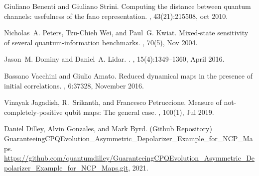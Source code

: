\documentclass[12pt]{iopart}
\begin{document}
\begin{thebibliography}{10}
Giuliano Benenti and Giuliano Strini.
\newblock Computing the distance between quantum channels: usefulness of the
  fano representation.
,
  43(21):215508, oct 2010.

Nicholas~A. Peters, Tzu-Chieh Wei, and Paul~G. Kwiat.
\newblock Mixed-state sensitivity of several quantum-information benchmarks.
, 70(5), Nov 2004.

Jason~M. {Dominy} and Daniel~A. {Lidar}.
.
, 15(4):1349--1360, April 2016.

Bassano Vacchini and Giulio Amato.
\newblock Reduced dynamical maps in the presence of initial correlations.
, 6:37328, November 2016.

Vinayak Jagadish, R.~Srikanth, and Francesco Petruccione.
\newblock Measure of not-completely-positive qubit maps: The general case.
, 100(1), Jul 2019.

Daniel Dilley, Alvin Gonzales, and Mark Byrd.
\newblock ({G}ithub {R}epository)
  {GuaranteeingCPQEvolution}\_{A}symmetric\_{D}epolarizer\_{E}xample\_for\_{NCP}\_{M}aps.
\newblock
  \url{https://github.com/quantumdilley/GuaranteeingCPQEvolution\_Asymmetric\_Depolarizer\_Example\_for\_NCP\_Maps.git},
  2021.

\end{thebibliography}
\end{document}
